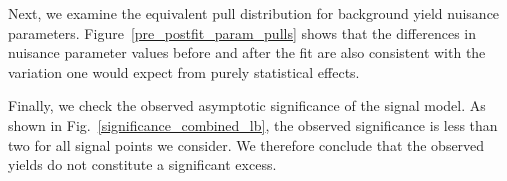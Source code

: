 


Next, we examine the equivalent pull distribution for background yield nuisance parameters. Figure~\ref{pre_postfit_param_pulls} shows that the differences in nuisance parameter values before and after the fit are also consistent with the variation one would expect from purely statistical effects.



Finally, we check the observed asymptotic significance of the \stoptolb signal model. As shown in Fig.~\ref{significance_combined_lb}, the observed significance is less than two for all signal points we consider. We therefore conclude that the observed yields do not constitute a significant excess.



\pagebreak